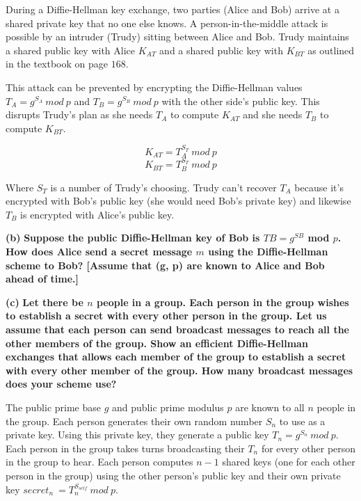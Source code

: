 \documentclass[11pt]{article}
\renewcommand\part[1]{\vspace{.10in}\textbf{(#1)}}
\begin{document}
During a Diffie-Hellman key exchange, two parties (Alice and Bob) arrive at a shared private key that no one else knows. A person-in-the-middle attack is possible by an intruder (Trudy) sitting between Alice and Bob. Trudy maintains a shared public key with Alice $K_{AT}$ and a shared public key with $K_{BT}$ as outlined in the textbook on page $168$.

This attack can be prevented by encrypting the Diffie-Hellman values $T_A = g^{S_A} \ mod \ p$ and $T_B = g^{S_B} \ mod \ p$ with the other side's public key. This disrupts Trudy's plan as she needs $T_A$ to compute $K_{AT}$ and she needs $T_B$ to compute $K_{BT}$.

$$K_{AT} = T_A^{S_T} \ mod \ p$$
$$K_{BT} = T_B^{S_T} \ mod \ p$$

Where $S_T$ is a number of Trudy's choosing. Trudy can't recover $T_A$ because it's encrypted with Bob's public key (she would need Bob's private key) and likewise $T_B$ is encrypted with Alice's public key.

\part{b} \textbf{Suppose the public Diffie-Hellman key of Bob is $TB = g^{SB}$ mod $p$. How does Alice send a secret message $m$ using the Diffie-Hellman scheme to Bob? [Assume that (g, p) are known to Alice and Bob ahead of time.]}



\part{c} \textbf{Let there be $n$ people in a group. Each person in the group wishes to establish a secret with every other person in the group. Let us assume that each person can send broadcast messages to reach all the other members of the group. Show an efficient Diffie-Hellman exchanges that allows each member of the group to establish a secret with every other member of the group. How many broadcast messages does your scheme use?}

The public prime base $g$ and public prime modulus $p$ are known to all $n$ people in the group. Each person generates their own random number $S_n$ to use as a private key. Using this private key, they generate a public key $T_n = g^{S_n} \ mod \ p$. Each person in the group takes turns broadcasting their $T_n$ for every other person in the group to hear. Each person computes $n-1$ shared keys (one for each other person in the group) using the other person's public key and their own private key $secret_n \ = T_n^{S_{self}} \ mod \ p$.
\end{document}
